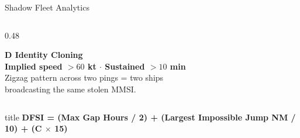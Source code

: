 \documentclass[10pt]{beamer}
\begin{document}
\begin{frame}[t]{Shadow Fleet Analytics}
\begin{columns}[T, totalwidth=\textwidth]
\begin{column}{0.48\textwidth}
    \vspace{9pt}

    \textbf{\textcolor{anomalyD}{D} \quad Identity Cloning}\\[2pt]
    {\footnotesize\textcolor{anomalyD}{\textbf{Implied speed \(> 60\) kt \(\cdot\) Sustained \(> 10\) min}}}\\[3pt]
    {\footnotesize
      Zigzag pattern across two pings = two ships\\
      broadcasting the same stolen MMSI.
    }
  \end{column}

\end{columns}

\vspace{18pt}
\begin{beamercolorbox}[sep=4pt, center, rounded=true]{title}
  \footnotesize\textbf{DFSI = (Max Gap Hours / 2) + (Largest Impossible Jump NM / 10) + (C \(\times\) 15)}
\end{beamercolorbox}

\end{frame}
\end{document}
